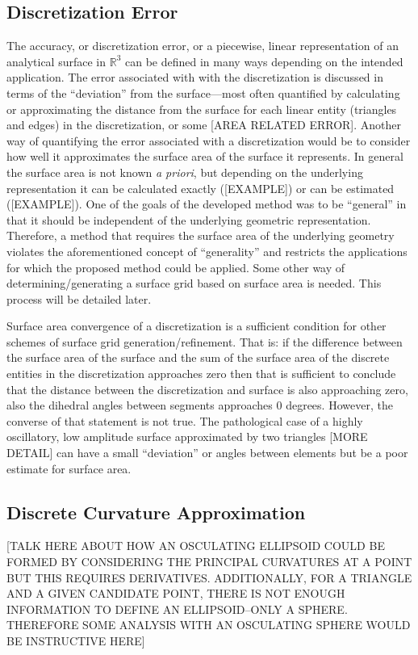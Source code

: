 \subsection{Discretization Error}
The accuracy, or discretization error, or a piecewise, linear representation of an analytical surface in ${\mathbb R}^3$ can be defined in many ways depending on the intended application. The error associated with with the discretization is discussed in terms of the ``deviation'' from the surface---most often quantified by calculating or approximating the distance from the surface for each linear entity (triangles and edges) in the discretization, or some [AREA RELATED ERROR]. Another way of quantifying the error associated with a discretization would be to consider how well it approximates the surface area of the surface it represents. In general the surface area is not known {\it a priori}, but depending on the underlying representation it can be calculated exactly ([EXAMPLE]) or can be estimated ([EXAMPLE]). One of the goals of the developed method was to be ``general'' in that it should be independent of the underlying geometric representation. Therefore, a method that requires the surface area of the underlying geometry violates the aforementioned concept of ``generality'' and restricts the applications for which the proposed method could be applied. Some other way of determining/generating a surface grid based on surface area is needed. This process will be detailed later.

Surface area convergence of a discretization is a sufficient condition for other schemes of surface grid generation/refinement. That is: if the difference between the surface area of the surface and the sum of the surface area of the discrete entities in the discretization approaches zero then that is sufficient to conclude that the distance between the discretization and surface is also approaching zero, also the dihedral angles between segments approaches $0$ degrees. However, the converse of that statement is not true. The pathological case of a highly oscillatory, low amplitude surface approximated by two triangles [MORE DETAIL] can have a small ``deviation'' or angles between elements but be a poor estimate for surface area.

\subsection{Discrete Curvature Approximation}
[TALK HERE ABOUT HOW AN OSCULATING ELLIPSOID COULD BE FORMED BY CONSIDERING THE PRINCIPAL CURVATURES AT A POINT BUT THIS REQUIRES DERIVATIVES. ADDITIONALLY, FOR A TRIANGLE AND A GIVEN CANDIDATE POINT, THERE IS NOT ENOUGH INFORMATION TO DEFINE AN ELLIPSOID--ONLY A SPHERE. THEREFORE SOME ANALYSIS WITH AN OSCULATING SPHERE WOULD BE INSTRUCTIVE HERE]

